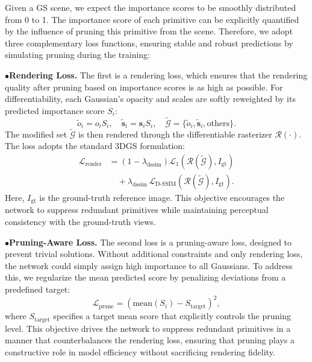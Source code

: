 Given a GS scene, we expect the importance scores to be smoothly distributed from 0 to 1. The importance score of each primitive can be explicitly quantified by the influence of pruning this primitive from the scene. Therefore, we adopt three complementary loss functions, ensuring stable and robust predictions by simulating pruning during the training:

$\bullet$\textbf{Rendering Loss.} The first is a rendering loss, which ensures that the rendering quality after pruning based on importance scores is as high as possible. 
For differentiability, each Gaussian’s opacity and scales are softly reweighted by its predicted importance score $S_i$:
\begin{equation}
\tilde{o}_i = o_i S_i, \quad 
\tilde{\mathbf{s}}_i = \mathbf{s}_i S_i, 
\quad \tilde{\mathcal{G}} = \{\tilde{o}_i, \tilde{\mathbf{s}}_i, \text{others}\}.
\end{equation}
The modified set $\tilde{\mathcal{G}}$ is then rendered through the differentiable rasterizer $\mathcal{R}(\cdot)$.
The loss adopts the standard 3DGS formulation:
\begin{align}
\mathcal{L}_{\text{render}} 
&= (1 - \lambda_{\text{dssim}})
   \mathcal{L}_{\text{1}}(\mathcal{R}(\tilde{\mathcal{G}}), I_{\text{gt}}) \nonumber \\
&\quad + \lambda_{\text{dssim}} \,
   \mathcal{L}_{\text{D-SSIM}}(\mathcal{R}(\tilde{\mathcal{G}}), I_{\text{gt}}).
\end{align}
Here, $I_{\text{gt}}$ is the ground-truth reference image. 
This objective encourages the network to suppress redundant primitives while maintaining perceptual consistency with the ground-truth views.

$\bullet$\textbf{Pruning-Aware Loss.} The second loss is a pruning-aware loss, designed to prevent trivial solutions. 
Without additional constraints and only rendering loss, the network could simply assign high importance to all Gaussians. 
To address this, we regularize the mean predicted score by penalizing deviations from a predefined target:
\begin{equation}
\mathcal{L}_{\text{prune}} = \left( \mathrm{mean}(S_i) - S_{\text{target}} \right)^2,
\end{equation}
where $S_{\text{target}}$ specifies a target mean score that explicitly controls the pruning level.
This objective drives the network to suppress redundant primitives in a manner that counterbalances the rendering loss, ensuring that pruning plays a constructive role in model efficiency without sacrificing rendering fidelity.

